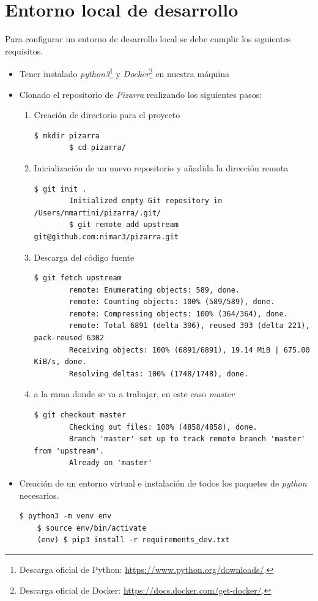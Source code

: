 \documentclass[11pt,spanish,listoffigures,listoftables]{tfgetsinf}
\begin{document}
\section{Entorno local de desarrollo}

Para configurar un entorno de desarrollo local se debe cumplir los siguientes requisitos.

\begin{itemize}
    \item  Tener instalado \textit{python3}\footnote{Descarga oficial de Python: \url{https://www.python.org/downloads/}.} y \textit{Docker}\footnote{Descarga oficial de Docker: \url{https://docs.docker.com/get-docker/}.} en nuestra máquina
	\item Clonado el repositorio de \textit{Pizarra} realizando los siguientes pasos:
	\begin{enumerate}
		\item Creación de directorio para el proyecto
		\begin{lstlisting}[style=ascii-tree]
		$ mkdir pizarra
		$ cd pizarra/
		\end{lstlisting}
		\item Inicialización de un nuevo repositorio y añadida la dirección remota
		\begin{lstlisting}[style=ascii-tree]
		$ git init .
		Initialized empty Git repository in /Users/nmartini/pizarra/.git/
		$ git remote add upstream git@github.com:nimar3/pizarra.git
		\end{lstlisting}
		\item Descarga del código fuente
		\begin{lstlisting}[style=ascii-tree]
		$ git fetch upstream
		remote: Enumerating objects: 589, done.
		remote: Counting objects: 100% (589/589), done.
		remote: Compressing objects: 100% (364/364), done.
		remote: Total 6891 (delta 396), reused 393 (delta 221), pack-reused 6302
		Receiving objects: 100% (6891/6891), 19.14 MiB | 675.00 KiB/s, done.
		Resolving deltas: 100% (1748/1748), done.
		\end{lstlisting}
		\item {} a la rama donde se va a trabajar, en este caso \textit{master}
		\begin{lstlisting}[style=ascii-tree]
		$ git checkout master
		Checking out files: 100% (4858/4858), done.
		Branch 'master' set up to track remote branch 'master' from 'upstream'.
		Already on 'master'
		\end{lstlisting}
	\end{enumerate}
	\item Creación de un entorno virtual e instalación de todos los \Gls{paquete}s de \textit{python} necesarios.
	\begin{lstlisting}[style=ascii-tree]
	$ python3 -m venv env
	$ source env/bin/activate   
	(env) $ pip3 install -r requirements_dev.txt
	\end{lstlisting}
\end{itemize}
\end{document}
